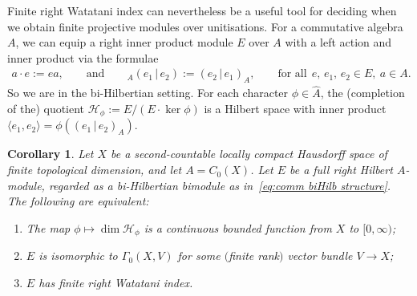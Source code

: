 \documentclass[pdftex]{sigma}
\numberwithin{equation}{section}
\newtheorem{corl}[thm]{Corollary}
 { \theoremstyle{definition}
\newtheorem{defn}[thm]{Definition}
\newtheorem{Example}[thm]{Example}
\newtheorem{rmk}[thm]{Remark}}
\renewcommand{\H}{\mathcal{H}} %
\begin{document}
Finite right Watatani index can nevertheless be a useful tool for deciding when we obtain f\/inite projective modules over unitisations. For a commutative algebra~$A$, we can equip a right inner product module $E$ over $A$ with a left action and inner product via the formulae
\begin{gather}\label{eq:comm biHilb structure}
a\cdot e:=ea,\qquad\mbox{and}\qquad {}_A(e_1 \,|\, e_2):=(e_2 \,|\, e_1)_A,\qquad\text{for all} \ \ e,\,e_1,\,e_2 \in E,\ a\in A.
\end{gather}
So we are in the bi-Hilbertian setting. For each character $\phi \in \widehat{A}$, the (completion of the) quotient $\H_\phi := E/(E \cdot \ker\phi)$ is a Hilbert space with inner product $\langle e_1,e_2\rangle = \phi((e_1\,|\, e_2)_A)$.

\begin{corl}\label{cor:VB2} Let $X$ be a second-countable locally compact Hausdorff space of finite topological dimension, and let $A=C_0(X)$. Let $E$ be a full right Hilbert $A$-module, regarded as a bi-Hilbertian bimodule as in~\eqref{eq:comm biHilb structure}. The following are equivalent:
\begin{enumerate}\itemsep=0pt
\item[$1)$] The map $\phi \mapsto \dim \H_\phi$ is a continuous bounded function from $X$ to $[0,\infty)$;
\item[$2)$] $E$ is isomorphic to $\Gamma_0(X,V)$ for some $($finite rank$)$ vector bundle $V\to X$;
\item[$3)$] $E$ has finite right Watatani index.
\end{enumerate}
\end{corl}
\end{document}
